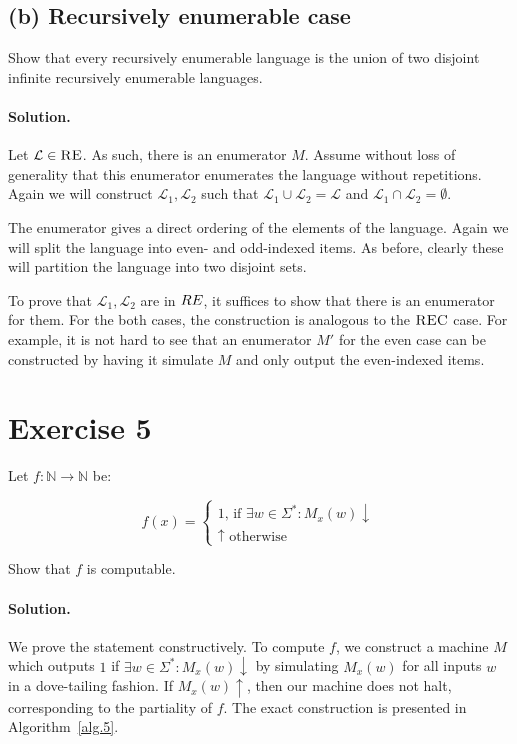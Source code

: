 \documentclass[11pt]{llncs}
\begin{document}
\subsection*{(b) Recursively enumerable case}
Show that every recursively enumerable language is the union of two disjoint
infinite recursively enumerable languages.

\paragraph{Solution.}

Let $\mathcal{L} \in \textsc{RE}$. As such, there is an enumerator $M$. Assume
without loss of generality that this enumerator enumerates the language without
repetitions. Again we will construct $\mathcal{L}_1, \mathcal{L}_2$ such that
$\mathcal{L}_1 \cup \mathcal{L}_2 = \mathcal{L}$ and $\mathcal{L}_1 \cap
\mathcal{L}_2 = \emptyset$.

The enumerator gives a direct ordering of the elements of the language. Again
we will split the language into even- and odd-indexed items. As before, clearly
these will partition the language into two disjoint sets.

To prove that $\mathcal{L}_1, \mathcal{L}_2$ are in $\sc RE$, it suffices to
show that there is an enumerator for them. For the both cases, the construction
is analogous to the $\textsc{REC}$ case. For example, it is not hard to see that
an enumerator $M'$ for the even case can be constructed by having it simulate
$M$ and only output the even-indexed items.

\section*{Exercise 5}
Let $f: \mathbb{N} \rightarrow \mathbb{N}$ be:

\[
    f(x) = \begin{cases}
        1 \text{, if } \exists w \in \Sigma^*: M_x(w) \downarrow\\
        \uparrow \text{ otherwise}
    \end{cases}
\]

Show that $f$ is computable.

\paragraph{Solution.}

We prove the statement constructively. To compute $f$, we construct a machine
$M$ which outputs $1$ if $\exists w \in \Sigma^*: M_x(w)\downarrow$ by
simulating $M_x(w)$ for all inputs $w$ in a dove-tailing fashion. If
$M_x(w)\uparrow$, then our machine does not halt, corresponding to the
partiality of $f$. The exact construction is presented in Algorithm~\ref{alg.5}.
\end{document}
